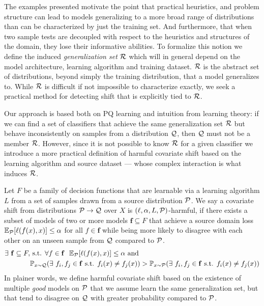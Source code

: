 The examples presented motivate the point that practical heuristics, and problem structure can lead to models generalizing to a more broad range of distributions than can be characterized by just the training set.
And furthermore, that when two sample tests are decoupled with respect to the heuristics and structures of the domain, they lose their informative abilities.
To formalize this notion we define the induced \textit{generalization set} $\mathcal{R}$ which will in general depend on the model architecture, learning algorithm and training dataset.
$\mathcal{R}$ is the abstract set of distributions, beyond simply the training distribution, that a model generalizes to.
While $\mathcal{R}$ is difficult if not impossible to characterize exactly, we seek a practical method for detecting shift that is explicitly tied to $\mathcal{R}$.

Our approach is based both on PQ learning and intuition from learning theory: if we can find a set of classifiers that achieve the same generalization
set $\mathcal{R}$ but behave inconsistently on samples from a distribution $\mathcal{Q}$, then $\mathcal{Q}$ must not be a member $\mathcal{R}$.
However, since it is not possible to know $\mathcal{R}$ for a given classifier we introduce a more practical definition of harmful covariate shift
based on the learning algorithm and source dataset --- whose complex interaction is what induces $\mathcal{R}$.

\begin{definition}
    Let $F$ be a family of decision functions that are learnable via a learning algorithm ${L}$ from a set of samples drawn from a source distribution $\mathcal{P}$.
    We say a covariate shift from distributions $\mathcal{P} \to \mathcal{Q}$ over $X$ is $(\ell, \alpha, L, \mathcal{P})$-harmful,
    if there exists a subset of models of two or more models $\mathbf{f} \subseteq F$ that achieve a source domain loss $\mathbb{E}_{\mathcal{P}}[\ell(f(x), x)] \leq \alpha$ for all $f\in \mathbf{f}$ while
    being more likely to disagree with each other on an unseen sample from $\mathcal{Q}$ compared to $\mathcal{P}$.
    \begin{equation}
        \begin{aligned}
            \exists\ \mathbf{f}\subseteq F, &\text{ s.t. } \forall f\in \mathbf{f}\ \ \mathbb{E}_{\mathcal{P}}[\ell(f(x), x)] \leq \alpha \text{ and } \\
            &\mathbb{P}_{x\sim \mathcal{Q}}(\exists\ f_i, f_j \in \mathbf{f}\text{ s.t. }f_i(x)\neq f_j(x)) > \mathbb{P}_{x\sim \mathcal{P}}(\exists\ f_i, f_j \in \mathbf{f}\text{ s.t. }f_i(x)\neq f_j(x))
        \end{aligned}\label{eq:hcs}
    \end{equation}
    In plainer words, we define harmful covariate shift based on the existence of multiple \textit{good} models on $\mathcal{P}$ that we assume learn the same generalization set, but
    that tend to disagree on $\mathcal{Q}$ with greater probability compared to $\mathcal{P}$.
\end{definition}


